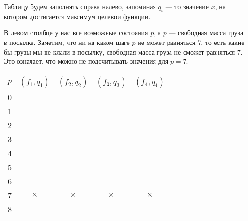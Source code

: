 Таблицу будем заполнять справа налево, запоминая $q_i$ --- то значение $x$, на котором достигается максимум целевой функции.

В левом столбце у нас все возможные состояния $p$, а $p$ --- свободная масса груза в посылке. Заметим, что ни на каком шаге $p$ не может равняться 7, то есть какие бы грузы мы не клали в посылку, свободная масса груза не сможет равняться 7. Это означает, что можно не подсчитывать значения для $p = 7$.

\begin{table}[H]
	\centering
	\begin{tabular}{ | c | c | c | c | c | } 
		\hline
		$p$ & $(f_1, q_1)$ & $(f_2, q_2)$ & $(f_3, q_3)$ & $(f_4, q_4)$ \\ 
		\hline
		0 & & & & \\\hline
		1 & & & & \\\hline
		2 & & & &\\\hline
		3 & & & & \\\hline
		4 & & & & \\\hline
		5 & & & & \\\hline
		6 & & & & \\\hline
		7 & $\times$ & $\times$ & $\times$ & $\times$ \\\hline
		8 & & & & \\\hline
	\end{tabular}
\end{table}

\bigskip


